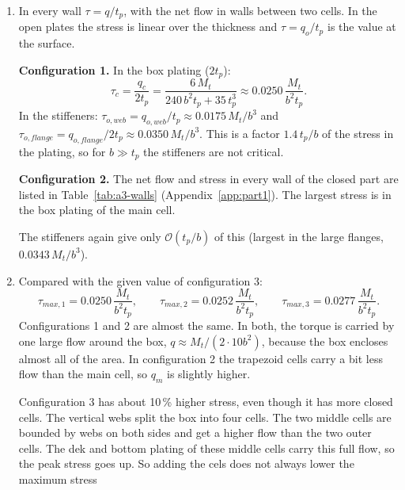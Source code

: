 \begin{enumerate}[label=\alph*., leftmargin=*]
  \item In every wall $\tau = q/t_p$, with the net flow in walls between two cells. In the open plates the stress is linear over the thickness and $\tau = q_o/t_p$ is the value at the surface.

  \textbf{Configuration 1.} In the box plating ($2t_p$):
  \begin{equation*}
    \tau_c = \frac{q_c}{2t_p} = \frac{6\,M_t}{240\,b^2t_p + 35\,t_p^3} \approx 0.0250\,\frac{M_t}{b^2t_p} .
  \end{equation*}
  In the stiffeners: $\tau_{o,web} = q_{o,web}/t_p \approx 0.0175\,M_t/b^3$ and $\tau_{o,flange} = q_{o,flange}/2t_p \approx 0.0350\,M_t/b^3$. This is a factor $1.4\,t_p/b$ of the stress in the plating, so for $b\gg t_p$ the stiffeners are not critical.

  \textbf{Configuration 2.} The net flow and stress in every wall of the closed part are listed in Table~\ref{tab:a3-walls} (Appendix~\ref{app:part1}). The largest stress is in the box plating of the main cell.
  
  The stiffeners again give only $\mathcal{O}(t_p/b)$ of this (largest in the large flanges, $0.0343\,M_t/b^3$).


  \item Compared with the given value of configuration 3:
  \begin{equation*}
    \tau_{max,1} = 0.0250\,\frac{M_t}{b^2t_p},\qquad
    \tau_{max,2} = 0.0252\,\frac{M_t}{b^2t_p},\qquad
    \tau_{max,3} = 0.0277\,\frac{M_t}{b^2t_p}.
  \end{equation*}
  Configurations 1 and 2 are almost the same. In both, the torque is carried by one large flow around the box, $q\approx M_t/(2\cdot10b^2)$, because the box encloses almost all of the area. In configuration 2 the trapezoid cells carry a bit less flow than the main cell, so $q_m$ is slightly higher.

  Configuration 3 has about 10\,\% higher stress, even though it has more closed cells. The vertical webs split the box into four cells. The two middle cells are bounded by webs on both sides and get a higher flow than the two outer cells. The dek and bottom plating of these middle cells carry this full flow, so the peak stress goes up. So adding the cels does not always lower the maximum stress
\end{enumerate}

